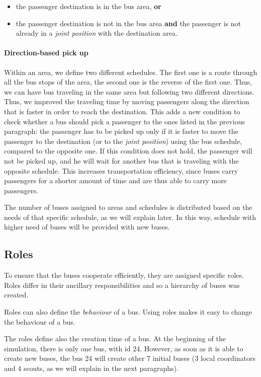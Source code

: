 \begin{itemize}
\item the passenger destination is in the bus area, \textbf{or}
\item the passenger destination is not in the bus area \textbf{and} the passenger is not already in a \textit{joint position} with the destination area.
\end{itemize}

\paragraph{Direction-based pick up}

Within an area, we define two different schedules. The first one is a route through all the bus stops of the area, the second one is the reverse of the first one. Thus, we can have bus traveling in the same area but following two different directions. Thus, we improved the traveling time by moving passengers along the direction that is faster in order to reach the destination. This adds a new condition to check whether a bus should pick a passenger to the ones listed in the previous paragraph: the passenger has to be picked up only if it is faster to move the passenger to the destination (or to the \textit{joint position}) using the bus schedule, compared to the opposite one. If this condition does not hold, the passenger will not be picked up, and he will wait for another bus that is traveling with the opposite schedule. This increases transportation efficiency, since buses carry passengers for a shorter amount of time and are thus able to carry more passengers. 

The number of buses assigned to areas and schedules is distributed based on the needs of that specific schedule, as we will explain later. In this way, schedule with higher need of buses will be provided with new buses.

\subsection{Roles}
\label{subsec:roles}

To ensure that the buses cooperate efficiently, they are assigned specific roles. Roles differ in their ancillary responsibilities and so a hierarchy of buses was created. 

Roles can also define the \textit{behaviour} of a bus. Using roles makes it easy to change the behaviour of a bus.

The roles define also the creation time of a bus. At the beginning of the simulation, there is only one bus, with id 24. However, as soon as it is able to create new buses, the bus 24 will create other 7 initial buses (3 local coordinators and 4 scouts, as we will explain in the next paragraphs).

